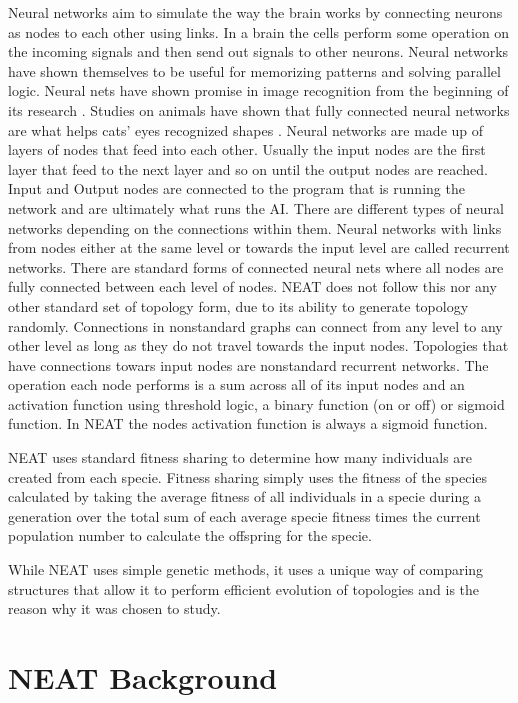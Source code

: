 \documentclass[12pt]{ucthesis} \newif\ifpdf \ifx\pdfoutput\undefined
\begin{document}
Neural networks aim to simulate the way the brain works by connecting neurons
as nodes to each other using links. In a brain the cells perform some operation on
the incoming signals and then send out signals to other neurons.
Neural networks have shown themselves to be useful for memorizing patterns and
solving parallel logic. Neural nets have shown promise in image recognition from
the beginning of its research \cite{lippmann}. Studies on animals have shown
that fully connected neural networks are what helps cats’ eyes recognized shapes
\cite{hubel1959receptive}.
Neural networks are made up of layers of nodes that feed into each other.
Usually the input nodes are the first layer that feed to the next layer and so
on until the output nodes are reached. Input and Output nodes are connected to
the program that is running the network and are ultimately what runs the AI.
There are different types of neural networks depending on the connections within
them. Neural networks with links from nodes either at the same level or towards
the input level are called recurrent networks. There are standard forms of
connected neural nets where all nodes are fully connected between each level of
nodes. NEAT does not follow this nor any other standard set of topology form,
due to its ability to generate topology randomly. Connections in nonstandard
graphs can connect from any level to any other level as long as they do not
travel towards the input nodes. Topologies that have connections towars
input nodes are nonstandard recurrent networks.
The operation each node performs is a sum across all of its input nodes and an
activation function using threshold logic, a binary function (on or off) or
sigmoid function. In NEAT the nodes activation function is always a sigmoid
function.

NEAT uses standard fitness sharing to determine how many individuals are
created from each specie. Fitness sharing simply uses the fitness of the species
calculated by taking the average fitness of all individuals in a specie during a
generation over the total sum of each average specie fitness times
the current population number to calculate the offspring for the specie.

While NEAT uses simple genetic methods, it uses a unique way of comparing
structures that allow it to perform efficient evolution of topologies and is the
reason why it was chosen to study.

\section{NEAT Background}
\end{document}

